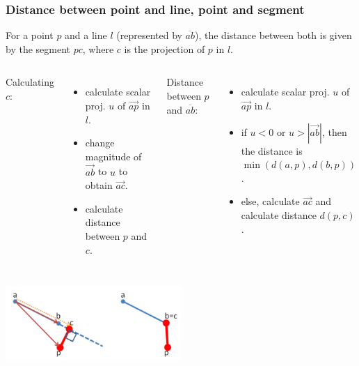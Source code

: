 \begin{frame}
  \frametitle{Distance between point and line, point and segment}
  \begin{block}{}
    For a point $p$ and a line $l$ (represented by $\overline{ab}$), the distance between both is given by the segment $pc$, where $c$ is the projection of $p$ in $l$.

    {\smaller
    \begin{columns}[T]
      Calculating $c$:
      \begin{itemize}
        \item calculate scalar proj. $u$ of $\vec{ap}$ in $l$.
        \item change magnitude of $\vec{ab}$ to $u$ to obtain $\vec{ac}$.
        \item calculate distance between $p$ and $c$.
      \end{itemize}
      Distance between $p$ and $\overline{ab}$:
      \begin{itemize}
        \item calculate scalar proj. $u$ of $\vec{ap}$ in $l$.
        \item if $u < 0$ or $u > |\vec{ab}|$, then the distance is $\min(d(a,p),d(b,p))$.
        \item else, calculate $\vec{ac}$ and calculate distance $d(p,c)$.
      \end{itemize}
    \end{columns}}
  \end{block}

  \begin{center}
    \includegraphics[width=0.5\textwidth]{../img/geom5}
  \end{center}
\end{frame}


